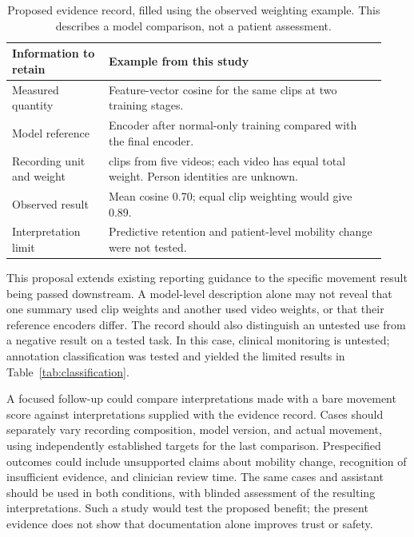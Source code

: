 \documentclass{article}
\begin{document}
\begin{table}[h]
\centering\small
\caption{Proposed evidence record, filled using the observed weighting example. This describes a model comparison, not a patient assessment.}
\label{tab:record}
\begin{tabular}{>{\raggedright\arraybackslash}p{0.24\linewidth}>{\raggedright\arraybackslash}p{0.69\linewidth}}
\toprule
Information to retain & Example from this study\\
\midrule
Measured quantity & Feature-vector cosine for the same clips at two training stages.\\
Model reference & Encoder after normal-only training compared with the final encoder.\\
Recording unit and weight & 64 clips from five videos; each video has equal total weight. Person identities are unknown.\\
Observed result & Mean cosine 0.70; equal clip weighting would give 0.89.\\
Interpretation limit & Predictive retention and patient-level mobility change were not tested.\\
\bottomrule
\end{tabular}
\end{table}

This proposal extends existing reporting guidance to the specific movement result being passed downstream. A model-level description alone may not reveal that one summary used clip weights and another used video weights, or that their reference encoders differ. The record should also distinguish an untested use from a negative result on a tested task. In this case, clinical monitoring is untested; annotation classification was tested and yielded the limited results in Table~\ref{tab:classification}.

A focused follow-up could compare interpretations made with a bare movement score against interpretations supplied with the evidence record. Cases should separately vary recording composition, model version, and actual movement, using independently established targets for the last comparison. Prespecified outcomes could include unsupported claims about mobility change, recognition of insufficient evidence, and clinician review time. The same cases and assistant should be used in both conditions, with blinded assessment of the resulting interpretations. Such a study would test the proposed benefit; the present evidence does not show that documentation alone improves trust or safety.
\end{document}
